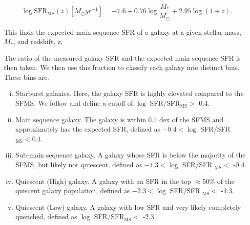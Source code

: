 \begin{equation}
\log \text{SFR}_{\text{MS}}(z)[M_\odot yr^{-1}] = -7.6 + 0.76\log\frac{M_*}{M_\odot} + 2.95\log(1+z).
\end{equation}

\noindent This finds the expected main sequence SFR of a galaxy at a given stellar mass, $M_*$, and redshift, z.

The ratio of the measured galaxy SFR and the expected main sequence SFR is then taken. We then use this fraction to classify each galaxy into distinct bins. These bins are:

\begin{enumerate}[(i)]
\item Starburst galaxies. Here, the galaxy SFR is highly elevated compared to the SFMS. We follow \citet{2019MNRAS.484.4360A} and define a cutoff of $\log$ SFR/SFR$_{\text{MS}} >$ 0.4.
\item Main sequence galaxy. The galaxy is within 0.4 dex of the SFMS and approximately has the expected SFR, defined as $-0.4 < \log$ SFR/SFR$_{\text{MS}} < 0.4$.
\item Sub-main sequence galaxy. A galaxy whose SFR is below the majority of the SFMS, but likely not quiescent, defined as $-1.3 < \log$ SFR/SFR $_{\text{MS}} < $ -0.4.
\item Quiescent (High) galaxy. A galaxy with an SFR in the top $\approx$50\% of the quiscent galaxy population, defined as $-2.3 < \log$ SFR/SFR $_{\text{MS}} <$ -1.3.
\item Quiescent (Low) galaxy. A galaxy with low SFR and very likely completely quenched, defined as $\log$ SFR/SFR$_{\text{MS}} <$ -2.3.
\end{enumerate}

